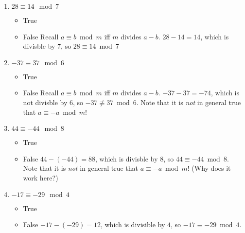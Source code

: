 \documentclass[11pt, preview]{standalone} %
\newcommand{\modequivhint}{Recall $a \equiv b \bmod m$ iff $m$ divides $a-b$.}
\begin{document}
\begin{enumerate}
\begin{enumerate}
\item $28 \equiv 14 \mod 7$
\begin{Choices}
\begin{itemize}
\TrueChoice\item True
\FalseChoice\item False
\Hint \modequivhint
\Solution $28 - 14 = 14$, which is divisble by $7$, so $28 \equiv 14 \bmod 7$
\end{itemize}
\end{Choices}

\item $-37 \equiv 37 \mod 6$
\begin{Choices}
\begin{itemize}
\FalseChoice\item True
\TrueChoice\item False
\Hint \modequivhint
\Solution $-37 - 37 = -74$, which is not divisble by $6$, so $-37 \not\equiv 37 \bmod 6$. Note that it is {\it not} in general true that $a \equiv -a \bmod m$!
\end{itemize}
\end{Choices}

\item $44 \equiv -44 \mod 8$
\begin{Choices}
\begin{itemize}
\TrueChoice\item True
\FalseChoice\item False
\Solution $44 - (-44) = 88$, which is divisble by $8$, so $44 \equiv -44 \bmod 8$. Note that it is {\it not} in general true that $a \equiv -a \bmod m$! (Why does it work here?)
\end{itemize}
\end{Choices}

\item $-17 \equiv -29 \mod 4$
\begin{Choices}
\begin{itemize}
\TrueChoice\item True
\FalseChoice\item False
\Solution $-17 - (-29) = 12$, which is divisible by $4$, so $-17 \equiv -29 \bmod 4$.
\end{itemize}
\end{Choices}
\end{enumerate}


\end{enumerate}
\end{document}
